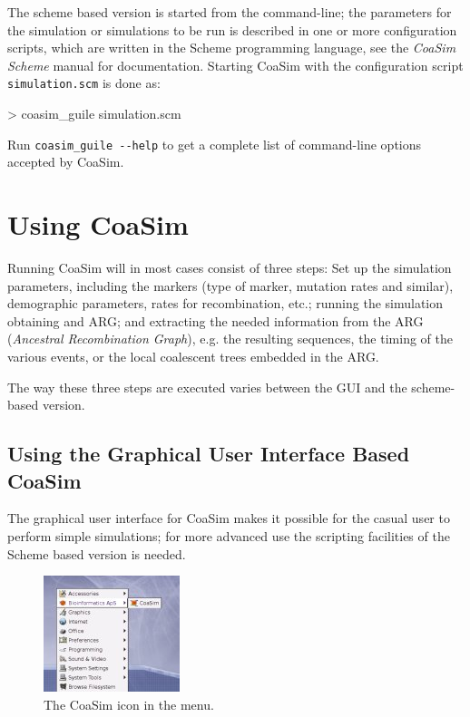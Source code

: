 \documentclass{manual}
\begin{document}
The scheme based version is started from the command-line; the
parameters for the simulation or simulations to be run is described in
one or more configuration scripts, which are written in the Scheme
programming language, see the \textit{CoaSim Scheme} manual for
documentation.  Starting CoaSim with the configuration script
\verb?simulation.scm?  is done as:
\begin{code}
> coasim_guile simulation.scm
\end{code}
Run \verb?coasim_guile --help? to get a complete list of command-line
options accepted by CoaSim.


\section{Using CoaSim}

Running CoaSim will in most cases consist of three steps: Set up the
simulation parameters, including the markers (type of marker, mutation
rates and similar), demographic parameters, rates for recombination,
etc.; running the simulation obtaining and ARG; and extracting the
needed information from the ARG (\emph{Ancestral Recombination
  Graph}), e.g. the resulting sequences, the timing of the various
events, or the local coalescent trees embedded in the ARG.

The way these three steps are executed varies between the GUI and the
scheme-based version.


\subsection{Using the Graphical User Interface Based CoaSim}
\label{sec:using-graphical-user}
The graphical user interface for CoaSim makes it possible for the
casual user to perform simple simulations; for more advanced use the
scripting facilities of the Scheme based version is needed.  

\begin{figure}
  \centering
  \includegraphics{figs/coasim-menu}
  \caption{The CoaSim icon in the menu.}
  \label{fig:menu}
\end{figure}
\end{document}
